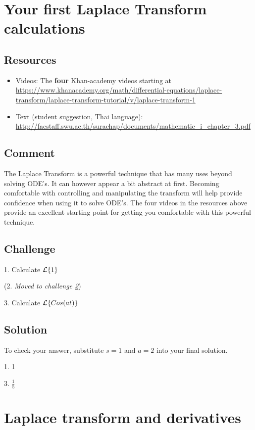 \section{Your first Laplace Transform calculations}

\subsection*{Resources}
\begin{itemize}
    \item Videos: The \textbf{four} Khan-academy videos starting at \url{https://www.khanacademy.org/math/differential-equations/laplace-transform/laplace-transform-tutorial/v/laplace-transform-1} %
    \item Text (student suggestion, Thai language): \url{http://facstaff.swu.ac.th/surachap/documents/mathematic_i_chapter_3.pdf}
\end{itemize}

\subsection*{Comment}
The Laplace Transform is a powerful technique that has many uses beyond solving ODE's. It can however appear a bit abstract at first. Becoming comfortable with controlling and manipulating the transform will help provide confidence when using it to solve ODE's. The four videos in the resources above provide an excellent starting point for getting you comfortable with this powerful technique.

\subsection*{Challenge}
1. Calculate $\mathcal{L}\{1\}$

(2. \emph{Moved to challenge \ref{sec:3rdderiv}})

3. Calculate $\mathcal{L}\{Cos(at)\}$

\subsection*{Solution}
To check your answer, substitute $s=1$ and $a=2$ into your final solution.

1. 1

3. $\frac{1}{5}$




\newpage
\section{Laplace transform and derivatives}
\label{sec:3rdderiv}

